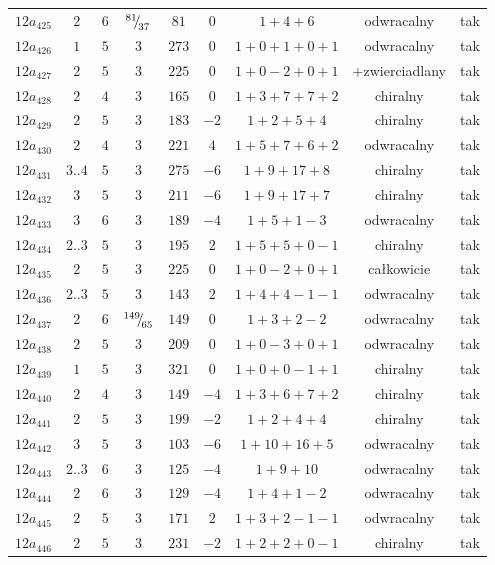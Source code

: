 \begin{longtable}{ccccccccc}
$12a_{425}$ & $2$ & $6$ & ${}^{81}{\mskip -5mu/\mskip -3mu}_{37}$ & $81$ & $0$ & $1+4+6$ & odwracalny & tak \\
$12a_{426}$ & $1$ & $5$ & $3$ & $273$ & $0$ & $1+0+1+0+1$ & odwracalny & tak \\
$12a_{427}$ & $2$ & $5$ & $3$ & $225$ & $0$ & $1+0-2+0+1$ & +zwierciadlany & tak \\
$12a_{428}$ & $2$ & $4$ & $3$ & $165$ & $0$ & $1+3+7+7+2$ & chiralny & tak \\
$12a_{429}$ & $2$ & $5$ & $3$ & $183$ & $-2$ & $1+2+5+4$ & chiralny & tak \\
$12a_{430}$ & $2$ & $4$ & $3$ & $221$ & $4$ & $1+5+7+6+2$ & odwracalny & tak \\
$12a_{431}$ & $3..4$ & $5$ & $3$ & $275$ & $-6$ & $1+9+17+8$ & chiralny & tak \\
$12a_{432}$ & $3$ & $5$ & $3$ & $211$ & $-6$ & $1+9+17+7$ & chiralny & tak \\
$12a_{433}$ & $3$ & $6$ & $3$ & $189$ & $-4$ & $1+5+1-3$ & odwracalny & tak \\
$12a_{434}$ & $2..3$ & $5$ & $3$ & $195$ & $2$ & $1+5+5+0-1$ & chiralny & tak \\
$12a_{435}$ & $2$ & $5$ & $3$ & $225$ & $0$ & $1+0-2+0+1$ & całkowicie & tak \\
$12a_{436}$ & $2..3$ & $5$ & $3$ & $143$ & $2$ & $1+4+4-1-1$ & odwracalny & tak \\
$12a_{437}$ & $2$ & $6$ & ${}^{149}{\mskip -5mu/\mskip -3mu}_{65}$ & $149$ & $0$ & $1+3+2-2$ & odwracalny & tak \\
$12a_{438}$ & $2$ & $5$ & $3$ & $209$ & $0$ & $1+0-3+0+1$ & odwracalny & tak \\
$12a_{439}$ & $1$ & $5$ & $3$ & $321$ & $0$ & $1+0+0-1+1$ & chiralny & tak \\
$12a_{440}$ & $2$ & $4$ & $3$ & $149$ & $-4$ & $1+3+6+7+2$ & chiralny & tak \\
$12a_{441}$ & $2$ & $5$ & $3$ & $199$ & $-2$ & $1+2+4+4$ & chiralny & tak \\
$12a_{442}$ & $3$ & $5$ & $3$ & $103$ & $-6$ & $1+10+16+5$ & odwracalny & tak \\
$12a_{443}$ & $2..3$ & $6$ & $3$ & $125$ & $-4$ & $1+9+10$ & odwracalny & tak \\
$12a_{444}$ & $2$ & $6$ & $3$ & $129$ & $-4$ & $1+4+1-2$ & odwracalny & tak \\
$12a_{445}$ & $2$ & $5$ & $3$ & $171$ & $2$ & $1+3+2-1-1$ & odwracalny & tak \\
$12a_{446}$ & $2$ & $5$ & $3$ & $231$ & $-2$ & $1+2+2+0-1$ & chiralny & tak \\

\end{longtable}

